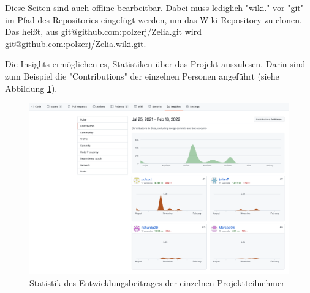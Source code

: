 Diese Seiten sind auch offline bearbeitbar. Dabei muss lediglich "wiki." vor "git" im Pfad des Repositories eingefügt werden, um das Wiki Repository zu clonen. Das heißt, aus {\ttfamily git@github.com:polzerj/Zelia.git} wird\\ {\ttfamily git@github.com:polzerj/Zelia.wiki.git}. 


Die Insights ermöglichen es, Statistiken über das Projekt auszulesen. Darin sind zum Beispiel die "Contributions" der einzelnen Personen angeführt (siehe Abbildung \ref{fig:insights}).

\begin{figure}[H]
    \centering
    \includegraphics[width=\textwidth]{media/ProjectManagement/Insights.png}
    \caption{Statistik des Entwicklungsbeitrages der einzelnen Projektteilnehmer}
    \label{fig:insights}
\end{figure}